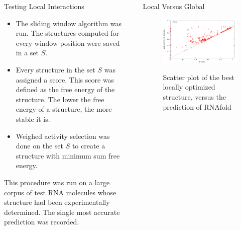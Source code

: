 \documentclass[final]{beamer}
\newlength{\sepwid}
\newlength{\onecolwid}
\begin{document}
\begin{frame}[t]
\begin{columns}[t]
\begin{column}{\onecolwid}
\begin{block}{Testing Local Interactions}
\vspace{0.25in}
\begin{itemize}
\item The sliding window algorithm was run. The structures computed for every window position were saved in a set $S$. \\
\item Every structure in the set $S$ was assigned a score. This score was defined as the free energy of the structure. The lower the free energy of a structure, the more stable it is. \\
\item Weighed activity selection was done on the set $S$ to create a structure with minimum sum free energy.
\end{itemize}
\vspace{0.25in}
This procedure was run on a large corpus of test RNA molecules whose structure had been experimentally determined. The single most accurate prediction was recorded.

         
          \end{block} 
    
    \end{column}
    
    
    
    
    
    
 \begin{column}{\sepwid}\end{column}			%
    \begin{column}{\onecolwid}
    
    
    
    \begin{block}{Local Versus Global}

        \begin{figure}
          \begin{center}
            \includegraphics[width=10in]{wasrnafoldplot.pdf} \\
            \caption{Scatter plot of the best locally optimized structure, versus the prediction of RNAfold}
            \label{fig:wasvsrnafoldplot}
          \end{center}
        \end{figure}            
            \vspace{0.25in}


\end{block}
\end{column}
\end{columns}
\end{frame}
\end{document}

